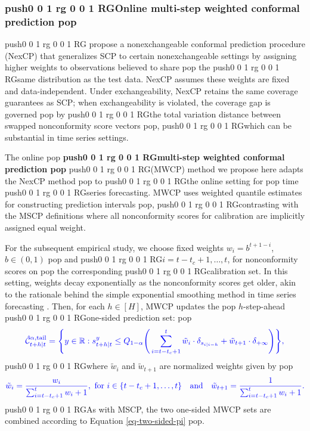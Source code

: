 \documentclass[
  american,
  12pt]{article}
\theoremstyle{plain}
\theoremstyle{plain}
\theoremstyle{remark}
\newcommand{\CPTSadd}[1]{\ifmmode\else\leavevmode\fi\pdfcolorstack 0 push{0 0 1 rg 0 0 1 RG}#1\pdfcolorstack 0 pop}
\begin{document}
\subsubsection{\CPTSadd{Online multi-step weighted conformal
prediction}}\label{online-multi-step-weighted-conformal-prediction}

\CPTSadd{\citet{barber2023} propose a nonexchangeable conformal prediction
procedure (NexCP) that generalizes SCP to certain nonexchangeable
settings by assigning higher weights to observations believed to share}
the \CPTSadd{same distribution as the test data. NexCP assumes these weights are
fixed and data-independent. Under exchangeability, NexCP retains the
same coverage guarantees as SCP; when exchangeability is violated, the
coverage gap is governed} by \CPTSadd{the total variation distance between swapped
nonconformity score vectors}, \CPTSadd{which can be substantial in time series
settings.

The online} \textbf{\CPTSadd{multi-step weighted conformal prediction}} \CPTSadd{(MWCP)
method we propose here adapts the NexCP method} to \CPTSadd{the online setting for}
time \CPTSadd{series forecasting. MWCP uses weighted quantile estimates for
constructing prediction intervals}, \CPTSadd{contrasting with the MSCP definitions
where all nonconformity scores for calibration are implicitly assigned
equal weight.

For the subsequent empirical study, we choose fixed weights
\(w_i = b^{t+1-i}\), \(b \in (0, 1)\)} and \CPTSadd{\(i=t-t_c+1, \dots, t\), for
nonconformity scores on} the corresponding \CPTSadd{calibration set. In this
setting, weights decay exponentially as the nonconformity scores get
older, akin to the rationale behind the simple exponential smoothing
method in time series forecasting \citep{hyndman2021}. Then, for each
\(h \in [H]\), MWCP updates the} \(h\)-step-ahead \CPTSadd{one-sided prediction
set:} \[
\CPTSadd{\hat{\mathcal{C}}_{t+h|t}^{\alpha,\mathrm{tail}} = \Bigg\{y\in\mathbb{R}: s_{t+h|t}^{y} \leq Q_{1-\alpha}\Bigg(\sum_{i=t-t_c+1}^{t}\tilde{w}_i\cdot\delta_{s_{i|i-h}}+\tilde{w}_{t+1}\cdot\delta_{+\infty}\Bigg)\Bigg\},}
\] \CPTSadd{where \(\tilde{w}_i\) and \(\tilde{w}_{t+1}\) are normalized weights
given by} \[
\CPTSadd{\tilde{w}_i = \frac{w_i}{\sum_{i=t-t_c+1}^{t}w_i+1}, \text{ for } i \in \{t-t_c+1, \dots, t\} \quad \text{and} \quad \tilde{w}_{t+1} =  \frac{1}{\sum_{i=t-t_c+1}^{t}w_i+1}.}
\] \CPTSadd{As with MSCP, the two one-sided MWCP sets are combined according to
Equation \eqref{eq-two-sided-pi}}.
\end{document}
